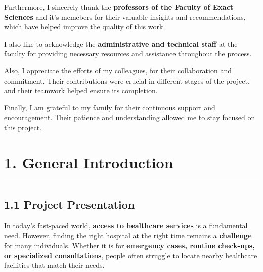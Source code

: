 \documentclass[12pt]{report}
\begin{document}
\noindent Furthermore, I sincerely thank the \textbf{professors of the Faculty of Exact Sciences} and it's memebers for their valuable insights and recommendations, which have helped improve the quality of this work.  \vspace*{0.5cm}

\noindent I also like to acknowledge the \textbf{administrative and technical staff} at the faculty for providing necessary resources and assistance throughout the process.  \vspace*{0.5cm}

\noindent Also, I appreciate the efforts of my colleagues, for their collaboration and commitment. Their contributions were crucial in different stages of the project, and their teamwork helped ensure its completion.  \vspace*{0.5cm}

\noindent Finally, I am grateful to my family for their continuous support and encouragement. Their patience and understanding allowed me to stay focused on this project.

\newpage












\section*{\textbf{1. General Introduction}}
\rule{\linewidth}{1pt}  %



\subsection*{\textbf{1.1 Project Presentation}}

In today's fast-paced world, \textbf{access to healthcare services} is a fundamental need. However, finding the right hospital at the right time remains a \textbf{challenge} for many individuals. Whether it is for \textbf{emergency cases, routine check-ups, or specialized consultations}, people often struggle to locate nearby healthcare facilities that match their needs.
\end{document}
